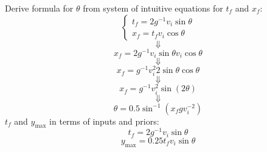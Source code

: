Derive formula for $\theta$ from system of intuitive equations
for $t_f$ and $x_f$:
$$\begin{cases}
t_f = 2 g^{-1} v_i \sin \theta \\
x_f = t_f v_i \cos \theta 
\end{cases}$$
$$\Downarrow$$
$$ x_f = 2 g^{-1} v_i \sin \theta v_i \cos \theta $$
$$\Downarrow$$
$$ x_f = g^{-1} v_i^2 2 \sin \theta \cos \theta $$
$$\Downarrow$$
$$ x_f = g^{-1} v_i^2 \sin (2\theta) $$
$$\Downarrow$$
\begin{equation} 
\theta = 0.5 \sin^{-1}\left(x_f g v_i^{-2}\right)
\end{equation}
$t_f$ and $y_{\text{max}}$ in terms of inputs and priors:
\begin{equation}
t_f = 2 g^{-1} v_i \sin \theta 
\end{equation}
\begin{equation}
y_{\text{max}} = 0.25 t_f v_i \sin \theta
\end{equation}